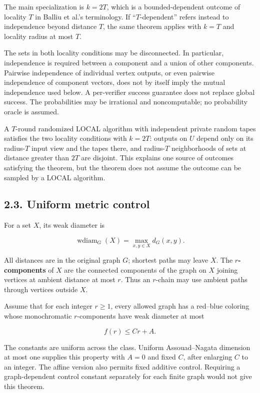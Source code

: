 \documentclass[11pt,a4paper]{article}
\begin{document}
The main specialization is \(k=2T\), which is a bounded-dependent outcome of locality \(T\) in Balliu et al.'s terminology.
If ``\(T\)-dependent'' refers instead to independence beyond distance \(T\), the same theorem applies with \(k=T\) and locality radius at most \(T\).

The sets in both locality conditions may be disconnected.
In particular, independence is required between a component and a union of other components.
Pairwise independence of individual vertex outputs, or even pairwise independence of component vectors, does not by itself imply the mutual independence used below.
A per-verifier success guarantee does not replace global success.
The probabilities may be irrational and noncomputable; no probability oracle is assumed.

A \(T\)-round randomized LOCAL algorithm with independent private random tapes satisfies the two locality conditions with \(k=2T\): outputs on \(U\) depend only on its radius-\(T\) input view and the tapes there, and radius-\(T\) neighborhoods of sets at distance greater than \(2T\) are disjoint.
This explains one source of outcomes satisfying the theorem, but the theorem does not assume the outcome can be sampled by a LOCAL algorithm.

\subsection{2.3. Uniform metric control}\label{uniform-metric-control}

For a set \(X\), its weak diameter is

\[ \operatorname{wdiam}_G(X)=\max_{x,y\in X}d_G(x,y). \]

All distances are in the original graph \(G\); shortest paths may leave \(X\).
The \textbf{\(r\)-components} of \(X\) are the connected components of the graph on \(X\) joining vertices at ambient distance at most \(r\).
Thus an \(r\)-chain may use ambient paths through vertices outside \(X\).

Assume that for each integer \(r\ge 1\), every allowed graph has a red--blue coloring whose monochromatic \(r\)-components have weak diameter at most

\[ f(r)\le Cr+A. \]

The constants are uniform across the class.
Uniform Assouad--Nagata dimension at most one supplies this property with \(A=0\) and fixed \(C\), after enlarging \(C\) to an integer.
The affine version also permits fixed additive control.
Requiring a graph-dependent control constant separately for each finite graph would not give this theorem.
\end{document}
